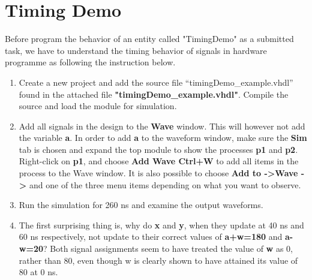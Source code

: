 \documentclass[a4paper,12pt]{article}
\begin{document}
\pagestyle{empty}
\setlength{\parindent}{0em} 

\section*{Timing Demo}

Before program the behavior of an entity called "TimingDemo" as a submitted task, we have to understand the timing behavior of signals in hardware programme as following the instruction below.

\begin{enumerate}
\item %
Create a new project and add the source file “timingDemo\_example.vhdl” found in the attached file \textbf{"timingDemo\_example.vhdl"}. Compile the source and load the module for simulation.

\item %
Add all signals in the design to the \textbf{Wave} window. This will however not add the variable \textbf{a}. In order to add \textbf{a} to the waveform window, make sure the \textbf{Sim} tab is chosen and expand the top module to show the processes \textbf{p1} and \textbf{p2}. Right-click on \textbf{p1}, and choose \textbf{Add Wave Ctrl+W} to add all items in the process to the Wave window. It is also possible to choose \textbf{Add to -\textgreater Wave -\textgreater} and one of the three menu items depending on what you want to observe.

\item %
Run the simulation for 260 ns and examine the output waveforms.

\item %
The first surprising thing is, why do \textbf{x} and \textbf{y}, when they update at 40 ns and 60 ns respectively, not update to their correct values of \textbf{a+w=180} and \textbf{a-w=20}? Both signal assignments seem to have treated the value of \textbf{w} as 0, rather than 80, even though w is clearly shown to have attained its value of 80 at 0 ns.


\end{enumerate}
\end{document}
